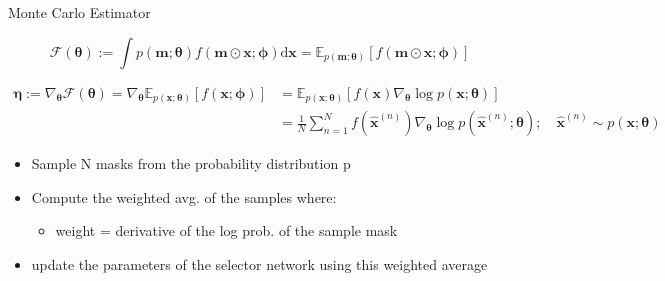 \documentclass[11pt,compress,t,notes=noshow, aspectratio=169, xcolor=table]{beamer}
\begin{document}
\begin{frame}{Monte Carlo Estimator}
   
\begin{equation*}
     \mathcal{F}(\boldsymbol{\theta}):=\int p(\mathbf{m} ; \boldsymbol{\theta}) f(\mathbf{m} \odot \mathbf{x} ; \boldsymbol{\phi}) \mathrm{d} \mathbf{x}=\mathbb{E}_{p(\mathbf{m} ; \boldsymbol{\theta})}[f(\mathbf{m} \odot \mathbf{x} ; \boldsymbol{\phi})]
\end{equation*}

$$
\begin{aligned}
\boldsymbol{\eta}:=\nabla_{\boldsymbol{\theta}} \mathcal{F}(\boldsymbol{\theta})=\nabla_{\boldsymbol{\theta}} \mathbb{E}_{p(\mathbf{x} ; \boldsymbol{\theta})}[f(\mathbf{x} ; \boldsymbol{\phi})] &=\mathbb{E}_{p(\mathbf{x} ; \boldsymbol{\theta})}\left[f(\mathbf{x}) \nabla_{\boldsymbol{\theta}} \log p(\mathbf{x} ; \boldsymbol{\theta})\right] \\
&=\frac{1}{N} \sum_{n=1}^N f\left(\hat{\mathbf{x}}^{(n)}\right) \nabla_{\boldsymbol{\theta}} \log p\left(\hat{\mathbf{x}}^{(n)} ; \boldsymbol{\theta}\right) ; \quad \hat{\mathbf{x}}^{(n)} \sim p(\mathbf{x} ; \boldsymbol{\theta})
\end{aligned}
$$



    \begin{itemize}
        \item Sample N masks from the probability distribution p
        \item Compute the weighted avg. of the samples where:
        \begin{itemize}
            \item weight = derivative of the log prob. of the sample mask
        \end{itemize}
        \item update the parameters of the selector network using this weighted average
    \end{itemize}
\end{frame}
\end{document}
